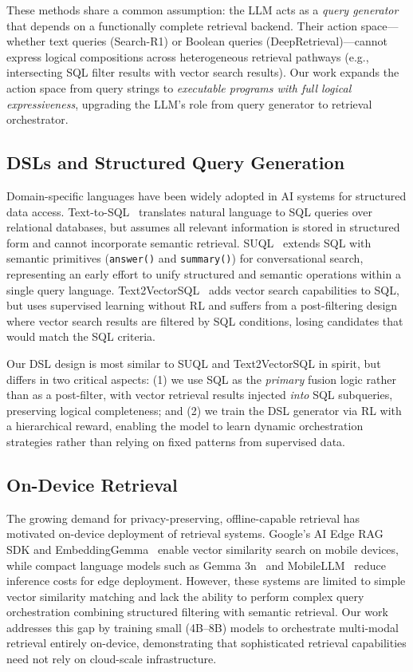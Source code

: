 \documentclass[11pt]{article}
\begin{document}
These methods share a common assumption: the LLM acts as a \emph{query generator} that depends on a functionally complete retrieval backend.
Their action space---whether text queries (Search-R1) or Boolean queries (DeepRetrieval)---cannot express logical compositions across heterogeneous retrieval pathways (e.g., intersecting SQL filter results with vector search results).
Our work expands the action space from query strings to \emph{executable programs with full logical expressiveness}, upgrading the LLM's role from query generator to retrieval orchestrator.

\subsection{DSLs and Structured Query Generation}
\label{sec:dsl}

Domain-specific languages have been widely adopted in AI systems for structured data access.
Text-to-SQL~\cite{yu2018spider, li2024can} translates natural language to SQL queries over relational databases, but assumes all relevant information is stored in structured form and cannot incorporate semantic retrieval.
SUQL~\cite{liu2024suql} extends SQL with semantic primitives (\texttt{answer()} and \texttt{summary()}) for conversational search, representing an early effort to unify structured and semantic operations within a single query language.
Text2VectorSQL~\cite{wang2024text2vectorsql} adds vector search capabilities to SQL, but uses supervised learning without RL and suffers from a post-filtering design where vector search results are filtered by SQL conditions, losing candidates that would match the SQL criteria.

Our DSL design is most similar to SUQL and Text2VectorSQL in spirit, but differs in two critical aspects: (1) we use SQL as the \emph{primary} fusion logic rather than as a post-filter, with vector retrieval results injected \emph{into} SQL subqueries, preserving logical completeness; and (2) we train the DSL generator via RL with a hierarchical reward, enabling the model to learn dynamic orchestration strategies rather than relying on fixed patterns from supervised data.

\subsection{On-Device Retrieval}
\label{sec:ondevice}

The growing demand for privacy-preserving, offline-capable retrieval has motivated on-device deployment of retrieval systems.
Google's AI Edge RAG SDK and EmbeddingGemma~\cite{google2025edgerag} enable vector similarity search on mobile devices, while compact language models such as Gemma 3n~\cite{team2025gemma} and MobileLLM~\cite{liu2024mobilellm} reduce inference costs for edge deployment.
However, these systems are limited to simple vector similarity matching and lack the ability to perform complex query orchestration combining structured filtering with semantic retrieval.
Our work addresses this gap by training small (4B--8B) models to orchestrate multi-modal retrieval entirely on-device, demonstrating that sophisticated retrieval capabilities need not rely on cloud-scale infrastructure.
\end{document}
